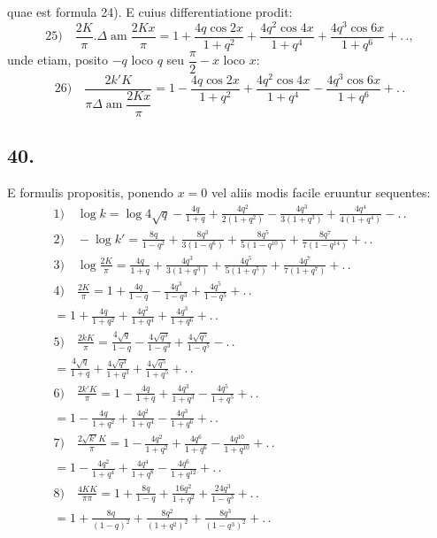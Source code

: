 \documentclass{article}
\begin{document}
quae est formula 24). E cuius differentiatione prodit:
\[
\text{25)}\quad\frac{2K}{\pi}.\Delta\operatorname{am}\frac{2Kx}{\pi}=1+\frac{4q\cos2x}{1+q^{2}}+\frac{4q^{2}\cos4x}{1+q^{4}}+\frac{4q^{3}\cos6x}{1+q^{6}}+.\,.,
\]
unde etiam, posito $-q$ loco $q$ seu $\dfrac{\pi}{2}-x$ loco $x$:
\[
\text{26)}\quad\frac{2k'K}{\pi\Delta\operatorname{am}\dfrac{2Kx}{\pi}}=1-\frac{4q\cos2x}{1+q^{2}}+\frac{4q^{2}\cos4x}{1+q^{4}}-\frac{4q^{3}\cos6x}{1+q^{6}}+.\,.
\]

\subsection*{40.}

E formulis propositis, ponendo $x=0$ vel aliis modis facile eruuntur sequentes:
\[
\begin{gathered}
\text{1)}\quad\log k=\log4\sqrt{q}-\frac{4q}{1+q}+\frac{4q^{2}}{2(1+q^{2})}-\frac{4q^{3}}{3(1+q^{3})}+\frac{4q^{4}}{4(1+q^{4})}-.\,.\\[2ex]
\text{2)}\quad-\log k'=\frac{8q}{1-q^{2}}+\frac{8q^{3}}{3(1-q^{6})}+\frac{8q^{5}}{5(1-q^{10})}+\frac{8q^{7}}{7(1-q^{14})}+.\,.\\[2ex]
\text{3)}\quad\log\frac{2K}{\pi}=\frac{4q}{1+q}+\frac{4q^{3}}{3(1+q^{3})}+\frac{4q^{5}}{5(1+q^{5})}+\frac{4q^{7}}{7(1+q^{7})}+.\,.\\[2ex]
\text{4)}\quad\frac{2K}{\pi}=1+\frac{4q}{1-q}-\frac{4q^{3}}{1-q^{3}}+\frac{4q^{5}}{1-q^{5}}+.\,.\\[2ex]
=1+\frac{4q}{1+q^{2}}+\frac{4q^{2}}{1+q^{4}}+\frac{4q^{3}}{1+q^{6}}+.\,.\\[2ex]
\text{5)}\quad\frac{2kK}{\pi}=\frac{4\sqrt{q}}{1-q}-\frac{4\sqrt{q^{3}}}{1-q^{3}}+\frac{4\sqrt{q^{5}}}{1-q^{5}}-.\,.\\[2ex]
=\frac{4\sqrt{q}}{1+q}+\frac{4\sqrt{q^{3}}}{1+q^{3}}+\frac{4\sqrt{q^{5}}}{1+q^{5}}+.\,.\\[2ex]
\text{6)}\quad\frac{2k'K}{\pi}=1-\frac{4q}{1+q}+\frac{4q^{3}}{1+q^{3}}-\frac{4q^{5}}{1+q^{5}}+.\,.\\[2ex]
=1-\frac{4q}{1+q^{2}}+\frac{4q^{2}}{1+q^{4}}-\frac{4q^{3}}{1+q^{6}}+.\,.\\[2ex]
\text{7)}\quad\frac{2\sqrt{k'}K}{\pi}=1-\frac{4q^{2}}{1+q^{2}}+\frac{4q^{6}}{1+q^{6}}-\frac{4q^{10}}{1+q^{10}}+.\,.\\[2ex]
=1-\frac{4q^{2}}{1+q^{4}}+\frac{4q^{4}}{1+q^{8}}-\frac{4q^{6}}{1+q^{12}}+.\,.\\[2ex]
\text{8)}\quad\frac{4KK}{\pi\pi}=1+\frac{8q}{1-q}+\frac{16q^{2}}{1+q^{2}}+\frac{24q^{3}}{1-q^{3}}+.\,.\\[2ex]
=1+\frac{8q}{(1-q)^{2}}+\frac{8q^{2}}{(1+q^{2})^{2}}+\frac{8q^{3}}{(1-q^{3})^{2}}+.\,.
\end{gathered}
\]
\end{document}
